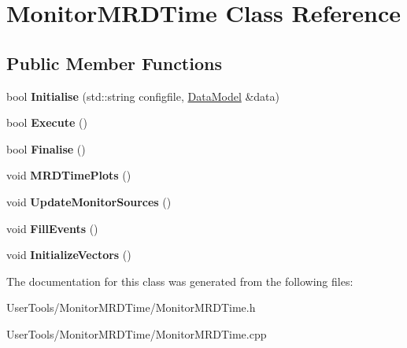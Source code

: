 \hypertarget{classMonitorMRDTime}{
\section{MonitorMRDTime Class Reference}
\label{classMonitorMRDTime}
}
\subsection*{Public Member Functions}
\begin{DoxyCompactItemize}
\item 
\hypertarget{classMonitorMRDTime_a0eb95583c6a147059859b56c0c2687ee}{
bool {\bfseries Initialise} (std::string configfile, \hyperlink{classDataModel}{DataModel} \&data)}
\label{classMonitorMRDTime_a0eb95583c6a147059859b56c0c2687ee}

\item 
\hypertarget{classMonitorMRDTime_af322d7679b5199d91caec6ca69226995}{
bool {\bfseries Execute} ()}
\label{classMonitorMRDTime_af322d7679b5199d91caec6ca69226995}

\item 
\hypertarget{classMonitorMRDTime_ad9b436fb72af740b16468463a50eefe6}{
bool {\bfseries Finalise} ()}
\label{classMonitorMRDTime_ad9b436fb72af740b16468463a50eefe6}

\item 
\hypertarget{classMonitorMRDTime_affa1155c36568467e553b8e9460ecf8a}{
void {\bfseries MRDTimePlots} ()}
\label{classMonitorMRDTime_affa1155c36568467e553b8e9460ecf8a}

\item 
\hypertarget{classMonitorMRDTime_ad2e2bfb694d2bf99d189f7b4496da16a}{
void {\bfseries UpdateMonitorSources} ()}
\label{classMonitorMRDTime_ad2e2bfb694d2bf99d189f7b4496da16a}

\item 
\hypertarget{classMonitorMRDTime_ad3380e8bac12fc88745a15dd0b68ed09}{
void {\bfseries FillEvents} ()}
\label{classMonitorMRDTime_ad3380e8bac12fc88745a15dd0b68ed09}

\item 
\hypertarget{classMonitorMRDTime_a3a81ee4967f10349d1f6571f7f4a8696}{
void {\bfseries InitializeVectors} ()}
\label{classMonitorMRDTime_a3a81ee4967f10349d1f6571f7f4a8696}

\end{DoxyCompactItemize}


The documentation for this class was generated from the following files:\begin{DoxyCompactItemize}
\item 
UserTools/MonitorMRDTime/MonitorMRDTime.h\item 
UserTools/MonitorMRDTime/MonitorMRDTime.cpp\end{DoxyCompactItemize}
